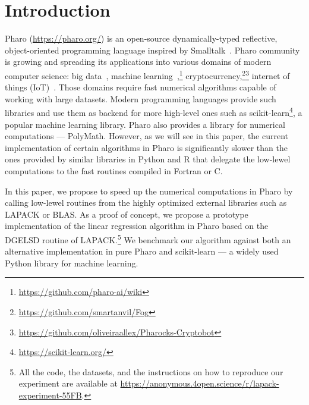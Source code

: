 \documentclass[]{ceurart}
\begin{document}
\maketitle



\section{Introduction}
\label{sec:Introduction}

Pharo (\url{https://pharo.org/}) is an open-source dynamically-typed reflective, object-oriented programming language inspired by Smalltalk~\cite{Blac09a}.
Pharo community is growing and spreading its applications into various domains of modern computer science: big data~\cite{Marr20a,Marr22a}, machine learning~\cite{Berg20a},\footnote{\url{https://github.com/pharo-ai/wiki}} cryptocurrency,\footnote{\url{https://github.com/smartanvil/Fog}}\footnote{\url{https://github.com/oliveiraallex/Pharocks-Cryptobot}} internet of things (IoT)~\cite{Oliv21a}.
Those domains require fast numerical algorithms capable of working with large datasets.
Modern programming languages provide such libraries and use them as backend for more high-level ones such as scikit-learn\footnote{\url{https://scikit-learn.org/}}, a popular machine learning library.
Pharo also provides a library for numerical computations --- PolyMath.
However, as we will see in this paper, the current implementation of certain algorithms in Pharo is significantly slower than the ones provided by similar libraries in Python and R that delegate the low-lewel computations to the fast routines compiled in Fortran or C.

In this paper, we propose to speed up the numerical computations in Pharo by calling low-lewel routines from the highly optimized external libraries such as LAPACK or BLAS.
As a proof of concept, we propose a prototype implementation of the linear regression algorithm in Pharo based on the DGELSD routine of LAPACK.\footnote{All the code, the datasets, and the instructions on how to reproduce our experiment are available at \url{https://anonymous.4open.science/r/lapack-experiment-55FB}. }
We benchmark our algorithm against both an alternative implementation in pure Pharo and scikit-learn --- a widely used Python library for machine learning.
\end{document}
